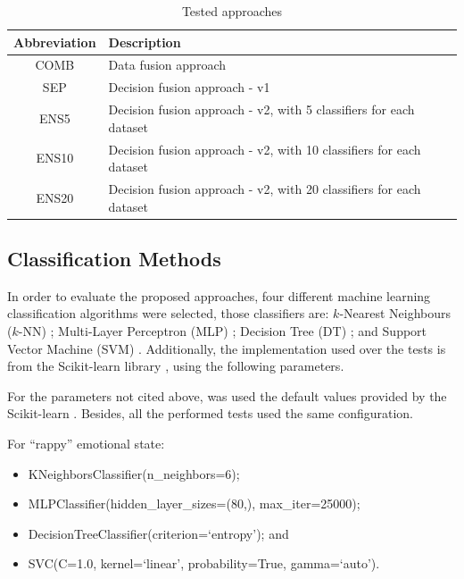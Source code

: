 \documentclass[conference]{IEEEtran}
\begin{document}
\begin{table}[H]
    \centering
    \caption{Tested approaches}
    \label{tab:approaches}
    \begin{tabular}{|c|p{6cm}|}
        \hline
         \textbf{Abbreviation} & \textbf{Description} \\ \hline
         COMB & Data fusion approach \\ \hline
         SEP & Decision fusion approach - v1 \\ \hline
         ENS5 & Decision fusion approach - v2,  with 5 classifiers for each dataset \\ \hline
         ENS10 & Decision fusion approach - v2,  with 10 classifiers for each dataset \\ \hline
         ENS20 & Decision fusion approach - v2,  with 20 classifiers for each dataset \\ \hline
    \end{tabular}
\end{table}


\subsection{Classification Methods}

In order to evaluate the proposed approaches, four different machine learning classification algorithms were selected, those classifiers are: $k$-Nearest Neighbours ($k$-NN) \cite{knn}; Multi-Layer Perceptron (MLP) \cite{mlp}; Decision Tree (DT) \cite{dt}; and Support Vector Machine (SVM) \cite{svm}. Additionally, the implementation used over the tests is from the Scikit-learn library \cite{sklearn}, using the following parameters.

For the parameters not cited above, was used the default values provided by the Scikit-learn \cite{sklearn}. Besides, all the performed tests used the same configuration.

For ``rappy'' emotional state:

\begin{itemize}
    \item KNeighborsClassifier(n\_neighbors=6);
    \item MLPClassifier(hidden\_layer\_sizes=(80,), max\_iter=25000);
    \item DecisionTreeClassifier(criterion=`entropy'); and
    \item SVC(C=1.0, kernel=`linear', probability=True, gamma=`auto').
\end{itemize}
\end{document}
